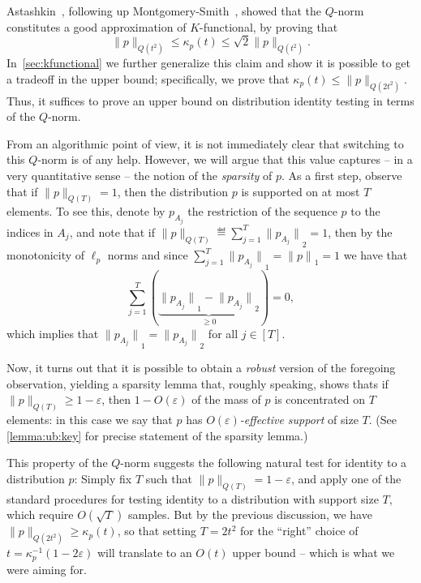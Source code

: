 \documentclass[11pt]{article}
\theoremstyle{remark}   	\newtheorem{remark}[theorem]{Remark}
\theoremstyle{definition}   	\newaliascnt{defn}{theorem}
\newcommand{\eps}{\ensuremath{\varepsilon}\xspace}
\newcommand{\norm}[1]{\lVert#1{\rVert}}
\newcommand{\normone}[1]{{\norm{#1}}_1}
\newcommand{\normtwo}[1]{{\norm{#1}}_2}
\newcommand{\lp}[1][1]{\ell_{#1}}
\newcommand{\kf}[1]{\kappa_{#1}}
\begin{document}
Astashkin~\cite{Astashkin:2010}, following up Montgomery-Smith~\cite{MS:90}, showed that the $Q$-norm constitutes a good approximation of $K$-functional, by proving that
  \begin{equation*}
    \norm{p}_{Q(t^2)} \leq \kf{p}(t) \leq \sqrt{2}\norm{p}_{Q(t^2)}.
  \end{equation*}
In~\autoref{sec:kfunctional} we further generalize this claim and show it is possible to get a tradeoff in the upper bound; specifically, we prove that
$\kf{p}(t) \leq \norm{p}_{Q(2t^2)}$. Thus, it suffices to prove an upper bound on distribution identity testing in terms of the $Q$-norm.

From an algorithmic point of view, it is not immediately clear that switching to this $Q$-norm is of any help. However, we will argue that this value captures -- in a very quantitative sense -- the notion of the \emph{sparsity} of $p$. As a first step, observe that if $\norm{p}_{Q(T)} = 1$, then the distribution $p$ is supported on at most $T$ elements. To see this, denote by ${p}_{A_j}$ the restriction of the sequence $p$ to the indices in $A_j$, and note that if $\norm{p}_{Q(T)} \eqdef \sum_{j=1}^T \normtwo{ {p}_{A_j} }=1$, then  by the monotonicity of $\lp[p]$ norms and since $\sum_{j=1}^T \normone{ {p}_{A_j} } = \normone{p}=1$ we have that
\[
      \sum_{j=1}^T (\underbrace{ \normone{ {p}_{A_j} } - \normtwo{ {p}_{A_j} } }_{\geq 0}) = 0,
\]
which implies that $\normone{ {p}_{A_j} } = \normtwo{ {p}_{A_j} }$ for all $j\in[T]$.

Now, it turns out that it is possible to obtain a \emph{robust} version of the foregoing observation, yielding a sparsity lemma that, roughly speaking, shows thats if $\norm{p}_{Q(T)} \geq 1-\eps$, then $1- O(\eps)$ of the mass of $p$ is concentrated on $T$ elements: in this case we say that $p$ has \emph{$O(\eps)$-effective support} of size $T$. (See \autoref{lemma:ub:key} for precise statement of the sparsity lemma.)

 This property of the $Q$-norm suggests the following natural test for identity to a distribution $p$: Simply fix $T$ such that  $\norm{p}_{Q(T)} = 1-\eps$, and apply one of the standard procedures for testing identity to a distribution with support size $T$, which require $O(\sqrt{T})$ samples. But by the previous discussion, we have $\norm{p}_{Q(2t^2)} \geq \kf{p}(t)$, so that setting $T=2t^2$ for the ``right'' choice of $t=\kf{p}^{-1}(1-2\eps)$ will translate to an $O(t)$ upper bound -- which is what we were aiming for.
 
\end{document}
